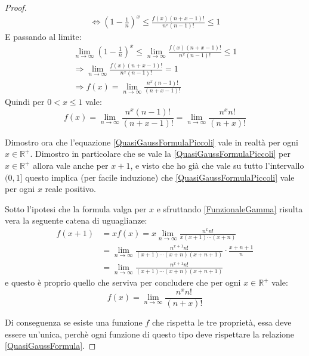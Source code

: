 \begin{proof}
\begin{gather*}
		\iff \left(1-\frac{1}{n}\right)^x \le  \frac{f(x)(n+x-1)!}{n^x(n-1)!} \le 1
	\end{gather*}
	E passando al limite:
	\begin{gather*}
		\lim_{n\to \infty} \left(1-\frac{1}{n}\right)^x \le \lim_{n\to \infty}  \frac{f(x)(n+x-1)!}{n^x(n-1)!} \le 1 \\
		\Longrightarrow \lim_{n\to \infty} \frac{f(x)(n+x-1)!}{n^x(n-1)!}  = 1 \\
		\Longrightarrow f(x) = \lim_{n\to \infty} \frac{n^x(n-1)!}{(n+x-1)!}
	\end{gather*}
	Quindi per $0<x\le 1$ vale:
	\begin{equation}\label{QuasiGaussFormulaPiccoli}
		f(x)=\lim_{n\to \infty} \frac{n^x(n-1)!}{(n+x-1)!}=\lim_{n\to \infty} \frac{n^xn!}{(n+x)!}
	\end{equation}
	
	Dimostro ora che l'equazione \cref{QuasiGaussFormulaPiccoli} vale in realtà per ogni $x\in\mathbb{R^+}$. 
	Dimostro in particolare che se vale la \cref{QuasiGaussFormulaPiccoli} per $x\in\mathbb{R^+}$ allora 
	vale anche per $x+1$, e visto che ho già che vale
	su tutto l'intervallo $(0,1]$ questo implica (per facile induzione) che \cref{QuasiGaussFormulaPiccoli} vale 
	per ogni $x$ reale positivo.
	
	Sotto l'ipotesi che la formula valga per $x$ e sfruttando \cref{FunzionaleGamma} risulta vera la seguente 
	catena di uguaglianze:
	\begin{equation*}
	\begin{split}
		f(x+1) & =xf(x)=x\lim_{n\to \infty} \frac{n^xn!}{x(x+1)\cdots(x+n)}\\
		& = \lim_{n\to \infty} \frac{n^{x+1}n!}{(x+1)\cdots(x+n)(x+n+1)}\cdot\frac{x+n+1}{n}\\
		& = \lim_{n\to \infty} \frac{n^{x+1}n!}{(x+1)\cdots(x+n)(x+n+1)}
	\end{split}
	\end{equation*}
	e questo è proprio quello che serviva per concludere che per ogni $x\in\mathbb{R^+}$ vale:
	\begin{equation}\label{QuasiGaussFormula}
		f(x)=\lim_{n\to \infty} \frac{n^xn!}{(n+x)!}
	\end{equation}
	
	Di conseguenza se esiste una funzione $f$ che rispetta le tre proprietà, essa deve essere un'unica, perchè ogni
	funzione di questo tipo deve rispettare la relazione \cref{QuasiGaussFormula}.
\end{proof}
 
